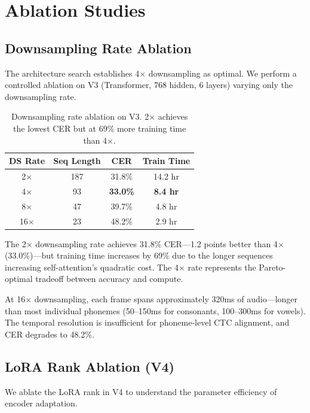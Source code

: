\documentclass[11pt]{article}
\begin{document}
\section{Ablation Studies}

\subsection{Downsampling Rate Ablation}

The architecture search establishes 4$\times$ downsampling as optimal.
We perform a controlled ablation on V3 (Transformer, 768 hidden, 6 layers) varying only the downsampling rate.

\begin{table}[t]
\centering
\small
\begin{tabular}{cccc}
\toprule
\textbf{DS Rate} & \textbf{Seq Length} & \textbf{CER} & \textbf{Train Time} \\
\midrule
2$\times$ & 187 & 31.8\% & 14.2 hr \\
4$\times$ & 93 & \textbf{33.0\%} & \textbf{8.4 hr} \\
8$\times$ & 47 & 39.7\% & 4.8 hr \\
16$\times$ & 23 & 48.2\% & 2.9 hr \\
\bottomrule
\end{tabular}
\caption{Downsampling rate ablation on V3. 2$\times$ achieves the lowest CER but at 69\% more training time than 4$\times$.}
\label{tab:ds-ablation}
\end{table}

The 2$\times$ downsampling rate achieves 31.8\% CER---1.2 points better than 4$\times$ (33.0\%)---but training time increases by 69\% due to the longer sequences increasing self-attention's quadratic cost.
The 4$\times$ rate represents the Pareto-optimal tradeoff between accuracy and compute.

At 16$\times$ downsampling, each frame spans approximately 320ms of audio---longer than most individual phonemes (50--150ms for consonants, 100--300ms for vowels).
The temporal resolution is insufficient for phoneme-level CTC alignment, and CER degrades to 48.2\%.

\subsection{LoRA Rank Ablation (V4)}

We ablate the LoRA rank in V4 to understand the parameter efficiency of encoder adaptation.
\end{document}
